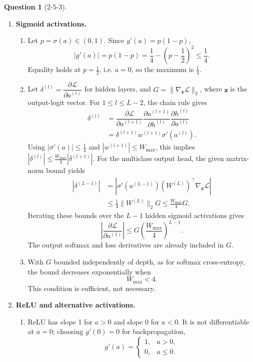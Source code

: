 \documentclass[12pt]{article}
\theoremstyle{definition}
\newtheorem{exercise}{Question}%
\newcommand{\pd}[2]{\dfrac{\partial #1}{\partial #2}}
\newcommand{\vect}[1]{\bm{#1}}
\begin{document}
\begin{exercise}[2-5-3]
{\begin{enumerate}[label=\textbf{(\arabic*)}, leftmargin=*]
    \item \textbf{Sigmoid activations.}
    \begin{enumerate}[label=\textbf{(\alph*)}, leftmargin=*]
        \item Let $p=\sigma(a)\in(0,1)$. Since $g'(a)=p(1-p)$,
        \[
            |g'(a)|=p(1-p)=\frac14-\left(p-\frac12\right)^2\leq\frac14.
        \]
        Equality holds at $p=\frac12$, i.e. $a=0$, so the maximum is
        $\boxed{\frac14}$.

        \item Let $\delta^{(l)}=\pd{\mathcal L}{a^{(l)}}$ for hidden layers,
        and $G=\|\nabla_{\vect{z}}\mathcal L\|_2$, where $\vect{z}$ is the
        output-logit vector. For $1\leq l\leq L-2$, the chain rule gives
        \begin{align*}
            \delta^{(l)}
                &=\pd{\mathcal L}{a^{(l+1)}}
                  \pd{a^{(l+1)}}{h^{(l)}}\pd{h^{(l)}}{a^{(l)}}\\
                &=\delta^{(l+1)}w^{(l+1)}\sigma'(a^{(l)}).
        \end{align*}
        Using $|\sigma'(a)|\leq\frac14$ and $|w^{(l+1)}|\leq W_{\max}$,
        this implies $|\delta^{(l)}|\leq\frac{W_{\max}}4|\delta^{(l+1)}|$.
        For the multiclass output head, the given matrix-norm bound yields
        \begin{align*}
            |\delta^{(L-1)}|
                &=\left|\sigma'(a^{(L-1)})(W^{(L)})^\top
                   \nabla_{\vect{z}}\mathcal L\right|\\
                &\leq\frac14\|W^{(L)}\|_2G
                 \leq\frac{W_{\max}}4G.
        \end{align*}
        Iterating these bounds over the $L-1$ hidden sigmoid activations gives
        \[
            \boxed{\left|\pd{\mathcal L}{a^{(1)}}\right|
            \leq G\left(\frac{W_{\max}}4\right)^{L-1}}.
        \]
        The output softmax and loss derivatives are already included in $G$.

        \item With $G$ bounded independently of depth, as for softmax
        cross-entropy, the bound decreases exponentially when
        \[
            \boxed{W_{\max}<4}.
        \]
        This condition is sufficient, not necessary.
    \end{enumerate}

    \item \textbf{ReLU and alternative activations.}
    \begin{enumerate}[label=\textbf{(\alph*)}, leftmargin=*]
        \item ReLU has slope 1 for $a>0$ and slope 0 for $a<0$.
        It is not differentiable at $a=0$; choosing $g'(0)=0$ for backpropagation,
        \[
            \boxed{g'(a)=\begin{cases}
                1,&a>0,\\
                0,&a\leq0.
            \end{cases}}
        \]


\end{enumerate}
\end{enumerate}}
\end{exercise}
\end{document}
